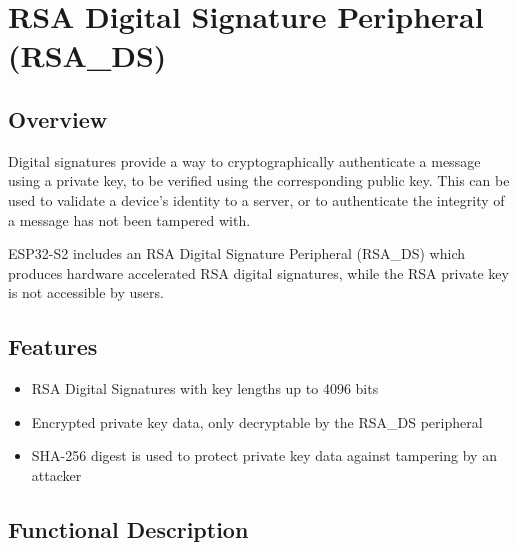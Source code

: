 \documentclass[main\_\_EN.tex]{subfiles}
\begin{document}

\ifglobal
\else
    {\let\clearpage\relax \listoftodos}
    {\let\clearpage\relax \listofdonetodos}
    \tableofcontents
\fi


\chapter{RSA Digital Signature Peripheral (RSA\_DS)}
\label{mod:digsig}
\hypertarget{digsig}{}\hypertarget{rsads}{}

\section{Overview}

Digital signatures provide a way to cryptographically authenticate a message using a private key, to be verified using the corresponding public key. This can be used to validate a device’s identity to a server, or to authenticate the integrity of a message has not been tampered with.

ESP32-S2 includes an RSA Digital Signature Peripheral (RSA\_DS) which produces hardware accelerated RSA digital signatures, while the RSA private key is not accessible by users.

\section{Features}

\begin{itemize}
    \item RSA Digital Signatures with key lengths up to 4096 bits
    \item Encrypted private key data, only decryptable by the RSA\_DS peripheral
    \item SHA-256 digest is used to protect private key data against tampering by an attacker
\end{itemize}


\section{Functional Description}
\end{document}
